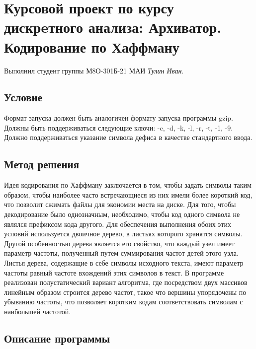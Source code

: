 \documentclass[12pt]{article}
\begin{document}
    \section*{Курсовой проект по курсу дискрeтного анализа: 
    Архиватор. Кодирование по Хаффману}

    Выполнил студент группы М8О-301Б-21 МАИ \textit{Тулин Иван}.

    \subsection*{Условие}
    
    Формат запуска должен быть аналогичен формату запуска программы gzip. 
    Должны быть поддерживаться следующие ключи: -c, -d, -k, -l, -r, -t, -1, -9. 
    Должно поддерживаться указание символа дефиса в качестве стандартного ввода.
    

    \subsection*{Метод решения}

    Идея кодирования по Хаффману заключается в том, чтобы задать символы таким образом, чтобы наиболее часто встречающиеся из них имели более короткий код, что позволит сжимать файлы для экономии места на диске. Для того, чтобы декодирование было однозначным, необходимо, чтобы код одного символа не являлся префиксом кода другого. Для обеспечения выполнения обоих этих условий используется двоичное дерево, в листьях которого хранятся символы. Другой особенностью дерева является его свойство, что каждый узел имеет параметр частоты, полученный путем суммирования частот детей этого узла. Листья дерева, содержащие в себе символы исходного текста, имеют параметр частоты равный частоте вхождений этих символов в текст. В программе реализован полустатический вариант алгоритма, где посредством двух массивов линейным образом строится дерево частот, такое  что вершины упорядочены по убыванию частоты, что позволяет коротким кодам соответствовать символам с наибольшей частотой.

    \subsection*{Описание программы}
\end{document}
